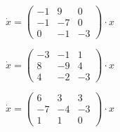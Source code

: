 \begin{multicols}{3}
\begin{enumtasks}
			\item \( \dot{x} = \begin{pmatrix} -1 & 9 & 0 \\ -1 & -7 & 0 \\ 0 & -1 & -3 \end{pmatrix} \cdot x \) %
			\item \( \dot{x} = \begin{pmatrix} -3 & -1 & 1 \\ 8 & -9 & 4 \\ 4 & -2 & -3 \end{pmatrix} \cdot x \) %
			\item \( \dot{x} = \begin{pmatrix} 6 & 3 & 3 \\ -7 & -4 & -3 \\ 1 & 1 & 0 \end{pmatrix} \cdot x \) %


\end{enumtasks}
\end{multicols}
